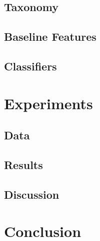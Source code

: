\documentclass[runningheads]{llncs}
\begin{document}
\subsection{Taxonomy}
\subsection{Baseline Features}
\subsection{Classifiers}
\section{Experiments}
\subsection{Data}
\subsection{Results}
\subsection{Discussion}
\section{Conclusion}



\end{document}
